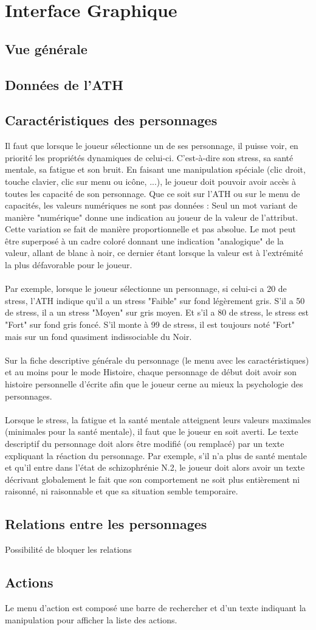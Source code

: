 \section{Interface Graphique}
\subsection{Vue générale}
\subsection{Données de l'ATH}
\subsection{Caractéristiques des personnages}
Il faut que lorsque le joueur sélectionne un de ses personnage, il puisse voir, en priorité les propriétés dynamiques de celui-ci. C'est-à-dire son stress, sa santé mentale, sa fatigue et son bruit. En faisant une manipulation spéciale (clic droit, touche clavier, clic sur menu ou icône, ...), le joueur doit pouvoir avoir accès à toutes les capacité de son personnage. Que ce soit sur l'ATH ou sur le menu de capacités, les valeurs numériques ne sont pas données : Seul un mot variant de manière "numérique" donne une indication au joueur de la valeur de l'attribut. Cette variation se fait de manière proportionnelle et pas absolue. Le mot peut être superposé à un cadre coloré donnant une indication "analogique" de la valeur, allant de blanc à noir, ce dernier étant lorsque la valeur est à l'extrémité la plus défavorable pour le joueur.
\\\\
Par exemple, lorsque le joueur sélectionne un personnage, si celui-ci a 20 de stress, l'ATH indique qu'il a un stress "Faible" sur fond légèrement gris. S'il a 50 de stress, il a un stress "Moyen" sur gris moyen. Et s'il a 80 de stress, le stress est "Fort" sur fond gris foncé. S'il monte à 99 de stress, il est toujours noté "Fort" mais sur un fond quasiment indissociable du Noir.
\\\\
Sur la fiche descriptive générale du personnage (le menu avec les caractéristiques) et au moins pour le mode Histoire, chaque personnage de début doit avoir son histoire personnelle d'écrite afin que le joueur cerne au mieux la psychologie des personnages.
\\\\
Lorsque le stress, la fatigue et la santé mentale atteignent leurs valeurs maximales (minimales pour la santé mentale), il faut que le joueur en soit averti. Le texte descriptif du personnage doit alors être modifié (ou remplacé) par un texte expliquant la réaction du personnage. Par exemple, s'il n'a plus de santé mentale et qu'il entre dans l'état de schizophrénie N.2, le joueur doit alors avoir un texte décrivant globalement le fait que son comportement ne soit plus entièrement ni raisonné, ni raisonnable et que sa situation semble temporaire.
\subsection{Relations entre les personnages}
Possibilité de bloquer les relations
\subsection{Actions}
Le menu d'action est composé une barre de rechercher et d'un texte indiquant la manipulation pour afficher la liste des actions.